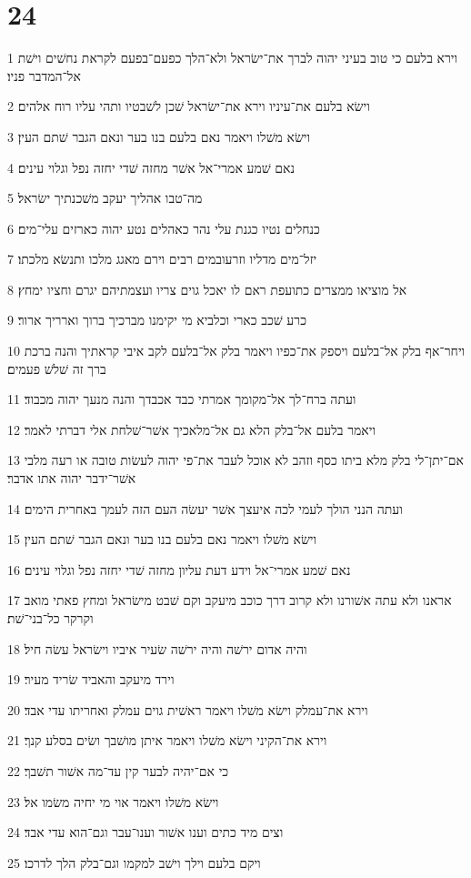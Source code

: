 \chapter{24}

\par 1 וירא בלעם כי טוב בעיני יהוה לברך את־ישׂראל ולא־הלך כפעם־בפעם לקראת נחשׁים וישׁת אל־המדבר פניו׃
\par 2 וישׂא בלעם את־עיניו וירא את־ישׂראל שׁכן לשׁבטיו ותהי עליו רוח אלהים׃
\par 3 וישׂא משׁלו ויאמר נאם בלעם בנו בער ונאם הגבר שׁתם העין׃
\par 4 נאם שׁמע אמרי־אל אשׁר מחזה שׁדי יחזה נפל וגלוי עינים׃
\par 5 מה־טבו אהליך יעקב משׁכנתיך ישׂראל׃
\par 6 כנחלים נטיו כגנת עלי נהר כאהלים נטע יהוה כארזים עלי־מים׃
\par 7 יזל־מים מדליו וזרעובמים רבים וירם מאגג מלכו ותנשׂא מלכתו׃
\par 8 אל מוציאו ממצרים כתועפת ראם לו יאכל גוים צריו ועצמתיהם יגרם וחציו ימחץ׃
\par 9 כרע שׁכב כארי וכלביא מי יקימנו מברכיך ברוך וארריך ארור׃
\par 10 ויחר־אף בלק אל־בלעם ויספק את־כפיו ויאמר בלק אל־בלעם לקב איבי קראתיך והנה ברכת ברך זה שׁלשׁ פעמים׃
\par 11 ועתה ברח־לך אל־מקומך אמרתי כבד אכבדך והנה מנעך יהוה מכבוד׃
\par 12 ויאמר בלעם אל־בלק הלא גם אל־מלאכיך אשׁר־שׁלחת אלי דברתי לאמר׃
\par 13 אם־יתן־לי בלק מלא ביתו כסף וזהב לא אוכל לעבר את־פי יהוה לעשׂות טובה או רעה מלבי אשׁר־ידבר יהוה אתו אדבר׃
\par 14 ועתה הנני הולך לעמי לכה איעצך אשׁר יעשׂה העם הזה לעמך באחרית הימים׃
\par 15 וישׂא משׁלו ויאמר נאם בלעם בנו בער ונאם הגבר שׁתם העין׃
\par 16 נאם שׁמע אמרי־אל וידע דעת עליון מחזה שׁדי יחזה נפל וגלוי עינים׃
\par 17 אראנו ולא עתה אשׁורנו ולא קרוב דרך כוכב מיעקב וקם שׁבט מישׂראל ומחץ פאתי מואב וקרקר כל־בני־שׁת׃
\par 18 והיה אדום ירשׁה והיה ירשׁה שׂעיר איביו וישׂראל עשׂה חיל׃
\par 19 וירד מיעקב והאביד שׂריד מעיר׃
\par 20 וירא את־עמלק וישׂא משׁלו ויאמר ראשׁית גוים עמלק ואחריתו עדי אבד׃
\par 21 וירא את־הקיני וישׂא משׁלו ויאמר איתן מושׁבך ושׂים בסלע קנך׃
\par 22 כי אם־יהיה לבער קין עד־מה אשׁור תשׁבך׃
\par 23 וישׂא משׁלו ויאמר אוי מי יחיה משׂמו אל׃
\par 24 וצים מיד כתים וענו אשׁור וענו־עבר וגם־הוא עדי אבד׃
\par 25 ויקם בלעם וילך וישׁב למקמו וגם־בלק הלך לדרכו׃

